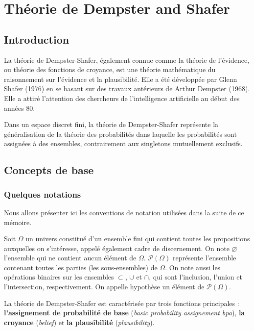 \chapter{Théorie de Dempster and Shafer}

{}
\section*{Introduction}

La théorie de Dempster-Shafer, également connue comme la théorie de l'évidence,
ou théorie des fonctions de croyance, est une théorie mathématique du raisonnement
sur l’évidence et la plausibilité. Elle a été développée par Glenn Shafer (1976)
en se basant sur des travaux antérieurs de Arthur Dempster (1968). Elle a attiré
l’attention des chercheurs de l'intelligence artificielle au début des années 80.

Dans un espace discret fini, la théorie de Dempster-Shafer représente la généralisation
de la théorie des probabilités dans laquelle les probabilités sont assignées à des ensembles,
contrairement aux singletons mutuellement exclusifs.

\section{Concepts de base}

\subsection{Quelques notations}

Nous allons présenter ici les conventions de notation utilisées dans la suite de ce mémoire.

Soit $\Omega$ un univers constitué d'un ensemble fini qui contient toutes les propositions
auxquelles on s'intéresse, appelé également cadre de discernement. On note $\varnothing$
l’ensemble qui ne contient aucun élément de $\Omega$. $\mathcal{P}(\Omega)$ représente
l’ensemble contenant toutes les parties (les sous-ensembles) de $\Omega$. On note aussi
les opérations binaires sur les ensembles $\subset$, $\cup$ et $\cap$, qui sont l’inclusion,
l’union et l’intersection, respectivement. On appelle hypothèse un élément de $\mathcal{P}(\Omega)$.

La théorie de Dempster-Shafer est caractérisée par trois fonctions principales :
\textbf{l’assignement de probabilité de base} (\emph{basic probability assignement bpa}),
\textbf{la croyance} (\emph{belief}) et \textbf{la plausibilité} (\emph{plausibility}).

